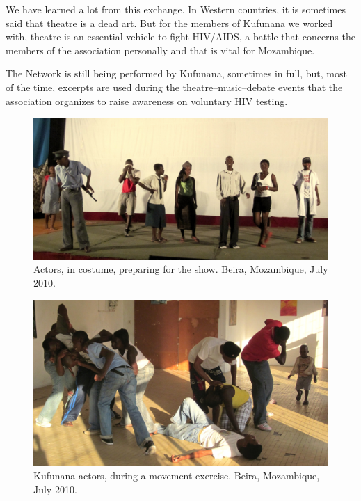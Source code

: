 \documentclass[article,twocolumn]{memoir}
\begin{document}
We have learned a lot from this exchange. In Western countries, it is sometimes
said that theatre is a dead art. But for the members of Kufunana we worked
with, theatre is an essential vehicle to fight HIV/AIDS, a battle that concerns
the members of the association personally and that is vital for Mozambique.

The Network is still being performed by Kufunana, sometimes in full, but, most
of the time, excerpts are used during the theatre--music--debate events that
the association organizes to raise awareness on voluntary HIV testing.

\begin{figure}[b]
\begin{center}
\includegraphics[width=.9\textwidth]{photographs/actors.jpg}
\end{center}
\caption{Actors, in costume, preparing for the show. Beira, Mozambique, July 2010.}
\label{fig:actors}
\end{figure}


\begin{figure}[b]
\begin{center}
\includegraphics[width=.9\textwidth]{photographs/exercises.jpg}
\end{center}
\caption{Kufunana actors, during a movement exercise. Beira, Mozambique, July 2010.}
\label{fig:exercise}
\end{figure}
\end{document}
